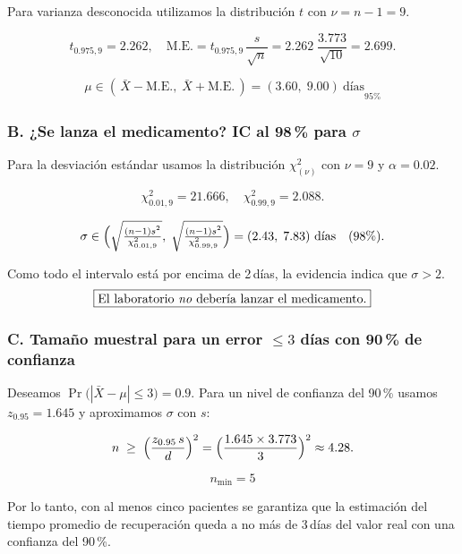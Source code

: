 \documentclass[12pt]{article}
\begin{document}
\begin{enumerate}
	      Para varianza desconocida utilizamos la distribución \(t\) con
	      \( \nu=n-1=9\).

	      \[
		      t_{0.975,9}=2.262,
		      \quad
		      \text{M.E.}=t_{0.975,9}\,\frac{s}{\sqrt{n}}
		      =2.262\;\frac{3.773}{\sqrt{10}}=2.699.
	      \]

	      \[
		      \boxed{ \mu \in (\,\bar X-\text{M.E.},\;\bar X+\text{M.E.}\,)
			      =(3.60,\;9.00)\ \text{días} }_{95\%}
	      \]

	      \subsubsection*{B. ¿Se lanza el medicamento? \;IC al 98\,\% para \(\sigma\)}

	      Para la desviación estándar usamos la distribución
	      \(\chi^{2}_{(\nu)}\) con \(\nu = 9\) y \(\alpha=0.02\).

	      \[
		      \chi^{2}_{0.01,9}=21.666,
		      \quad
		      \chi^{2}_{0.99,9}=2.088.
	      \]

	      \[
		      \sigma \in
		      \Bigl(
		      \sqrt{\tfrac{(n-1)s^{2}}{\chi^{2}_{0.01,9}}},
		      \;
		      \sqrt{\tfrac{(n-1)s^{2}}{\chi^{2}_{0.99,9}}}
		      \Bigr)
		      =(2.43,\;7.83)\ \text{días}\quad(98\%).
	      \]

	      Como todo el intervalo está por encima de 2\,días, la evidencia
	      indica que \(\sigma>2\).
	      \[
		      \boxed{\text{El laboratorio \emph{no} debería lanzar el medicamento}.}
	      \]

	      \subsubsection*{C. Tamaño muestral para un error \(\le 3\) días con 90\,\% de confianza}

	      Deseamos
	      \(\Pr\bigl(|\bar X-\mu|\le 3\bigr)=0.9\).
	      Para un nivel de confianza del 90\,\% usamos
	      \(z_{0.95}=1.645\) y aproximamos \(\sigma\) con \(s\):

	      \[
		      n \;\ge\;
		      \Bigl(\frac{z_{0.95}\,s}{d}\Bigr)^{2}
		      =
		      \Bigl(\frac{1.645\times3.773}{3}\Bigr)^{2}
		      \approx 4.28.
	      \]

	      \[
		      \boxed{n_{\min}=5}
	      \]

	      Por lo tanto, con al menos cinco pacientes se garantiza que la estimación del
	      tiempo promedio de recuperación queda a no más de 3\,días del valor real con
	      una confianza del 90\,\%.
	      \endgroup


\end{enumerate}
\end{document}
